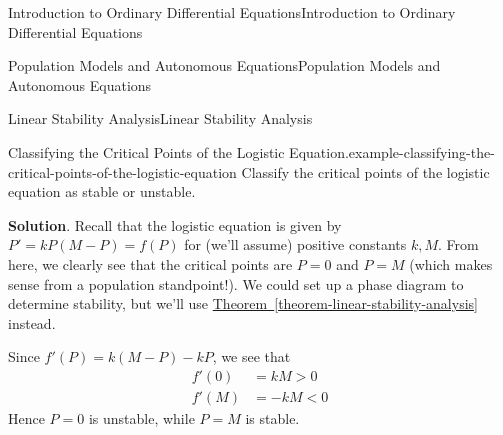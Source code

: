 \documentclass[10pt,]{book}
\numberwithin{equation}{section}
\newcommand{\lt}{<}
\newcommand{\gt}{>}
\begin{document}
\begin{chapterptx}{Introduction to Ordinary Differential Equations}{}{Introduction to Ordinary Differential Equations}{}{}
\begin{sectionptx}{Population Models and Autonomous Equations}{}{Population Models and Autonomous Equations}{}{}
\begin{subsectionptx}{Linear Stability Analysis}{}{Linear Stability Analysis}{}{}
\begin{example}{Classifying the Critical Points of the Logistic Equation.}{example-classifying-the-critical-points-of-the-logistic-equation}
\hypertarget{p-140}{}%
Classify the critical points of the logistic equation as stable or unstable.%
\par\smallskip%
\noindent\textbf{Solution}.\hypertarget{solution-23}{}\quad%
\hypertarget{p-141}{}%
Recall that the logistic equation is given by \(P' = kP(M-P) = f(P)\) for (we'll assume) positive constants \(k,M\). From here, we clearly see that the critical points are \(P = 0\) and \(P = M\) (which makes sense from a population standpoint!). We could set up a phase diagram to determine stability, but we'll use \hyperref[theorem-linear-stability-analysis]{Theorem~\ref{theorem-linear-stability-analysis}} instead.%
\par
\hypertarget{p-142}{}%
Since \(f'(P) = k(M-P) - kP\), we see that%
\begin{align*}
f'(0) & = kM \gt 0\\
f'(M) & = -kM \lt 0 
\end{align*}
Hence \(P = 0\) is unstable, while \(P = M\) is stable.%
\end{example}
\end{subsectionptx}
\end{sectionptx}
\end{chapterptx}
%
%
\typeout{************************************************}
\typeout{************************************************}
%
\end{document}

